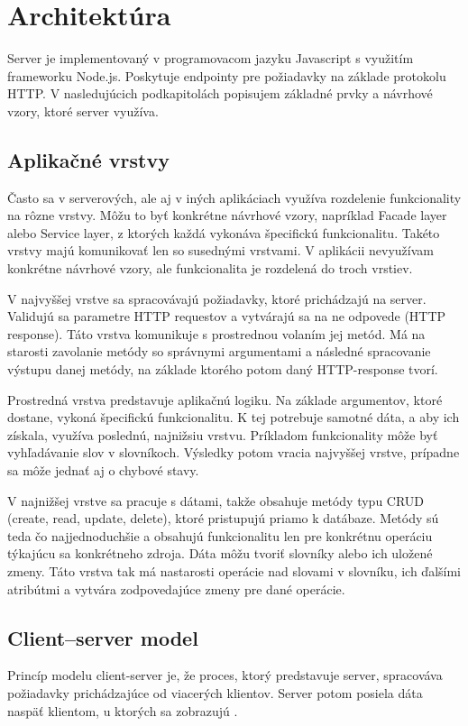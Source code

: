 \documentclass[
  digital, %
  table,   %
  lof,     %
  lot,     %
]{fithesis3}
\begin{document}
\section{Architektúra}
Server je implementovaný v programovacom jazyku Javascript s využitím frameworku Node.js. Poskytuje endpointy pre požiadavky na základe protokolu HTTP. V nasledujúcich podkapitolách popisujem základné prvky a návrhové vzory, ktoré server využíva.

\subsection{Aplikačné vrstvy}
Často sa v serverových, ale aj v iných aplikáciach využíva rozdelenie funkcionality na rôzne vrstvy. Môžu to byť konkrétne návrhové vzory, napríklad Facade layer alebo Service layer, z ktorých každá vykonáva špecifickú funkcionalitu. Takéto vrstvy majú komunikovať len so susednými vrstvami. V aplikácii nevyužívam konkrétne návrhové vzory, ale funkcionalita je rozdelená do troch vrstiev.

V najvyššej vrstve sa spracovávajú požiadavky, ktoré prichádzajú na server. Validujú sa parametre HTTP requestov a vytvárajú sa na ne odpovede (HTTP response). Táto vrstva komunikuje s prostrednou volaním jej metód. Má na starosti zavolanie metódy so správnymi argumentami a následné spracovanie výstupu danej metódy, na základe ktorého potom daný HTTP-response tvorí.

Prostredná vrstva predstavuje aplikačnú logiku. Na základe argumentov, ktoré dostane, vykoná špecifickú funkcionalitu. K tej potrebuje samotné dáta, a aby ich získala, využíva poslednú, najnižsiu vrstvu. Príkladom funkcionality môže byť vyhľadávanie slov v slovníkoch. Výsledky potom vracia najvyššej vrstve, prípadne sa môže jednať aj o chybové stavy.

V najnižšej vrstve sa pracuje s dátami, takže obsahuje metódy typu CRUD (create, read, update, delete), ktoré pristupujú priamo k datábaze. Metódy sú teda čo najjednoduchšie a obsahujú funkcionalitu len pre konkrétnu operáciu týkajúcu sa konkrétneho zdroja. Dáta môžu tvoriť slovníky alebo ich uložené zmeny. Táto vrstva tak má nastarosti operácie nad slovami v slovníku, ich ďalšími atribútmi a vytvára zodpovedajúce zmeny pre dané operácie.

\subsection{Client–server model}
Princíp modelu client-server je, že proces, ktorý predstavuje server, spracováva požiadavky prichádzajúce od viacerých klientov. Server potom posiela dáta naspäť klientom, u ktorých sa zobrazujú \parencite{hanson2000client}.
\end{document}
